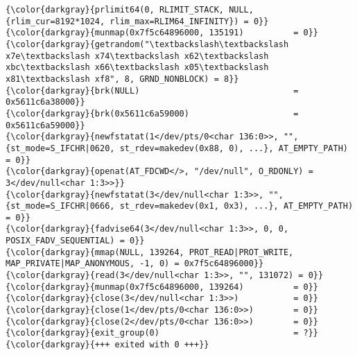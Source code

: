 {{\begin{Verbatim}[commandchars=\\\{\}]
{\color{darkgray}{prlimit64(0, RLIMIT_STACK, NULL, {rlim_cur=8192*1024, rlim_max=RLIM64_INFINITY}) = 0}}
{\color{darkgray}{munmap(0x7f5c64896000, 135191)          = 0}}
{\color{darkgray}{getrandom("\textbackslash\textbackslash x7e\textbackslash x74\textbackslash x62\textbackslash xbc\textbackslash x66\textbackslash x05\textbackslash x81\textbackslash xf8", 8, GRND_NONBLOCK) = 8}}
{\color{darkgray}{brk(NULL)                               = 0x5611c6a38000}}
{\color{darkgray}{brk(0x5611c6a59000)                     = 0x5611c6a59000}}
{\color{darkgray}{newfstatat(1</dev/pts/0<char 136:0>>, "", {st_mode=S_IFCHR|0620, st_rdev=makedev(0x88, 0), ...}, AT_EMPTY_PATH) = 0}}
{\color{darkgray}{openat(AT_FDCWD</>, "/dev/null", O_RDONLY) = 3</dev/null<char 1:3>>}}
{\color{darkgray}{newfstatat(3</dev/null<char 1:3>>, "", {st_mode=S_IFCHR|0666, st_rdev=makedev(0x1, 0x3), ...}, AT_EMPTY_PATH) = 0}}
{\color{darkgray}{fadvise64(3</dev/null<char 1:3>>, 0, 0, POSIX_FADV_SEQUENTIAL) = 0}}
{\color{darkgray}{mmap(NULL, 139264, PROT_READ|PROT_WRITE, MAP_PRIVATE|MAP_ANONYMOUS, -1, 0) = 0x7f5c64896000}}
{\color{darkgray}{read(3</dev/null<char 1:3>>, "", 131072) = 0}}
{\color{darkgray}{munmap(0x7f5c64896000, 139264)          = 0}}
{\color{darkgray}{close(3</dev/null<char 1:3>>)           = 0}}
{\color{darkgray}{close(1</dev/pts/0<char 136:0>>)        = 0}}
{\color{darkgray}{close(2</dev/pts/0<char 136:0>>)        = 0}}
{\color{darkgray}{exit_group(0)                           = ?}}
{\color{darkgray}{+++ exited with 0 +++}}
\end{Verbatim}
}}
\endinput  %